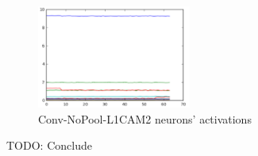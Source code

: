 				\begin{figure}[h]
					\centering
					\includegraphics[width=0.45\textwidth]{images/multiPosGraphConvnopool_CAM2_L1}
					\caption{Conv-NoPool-L1CAM2 neurons' activations}
					\label{fig:multipose_graph_noppol_CAM2_L1}
				\end{figure}

				TODO: Conclude
			



